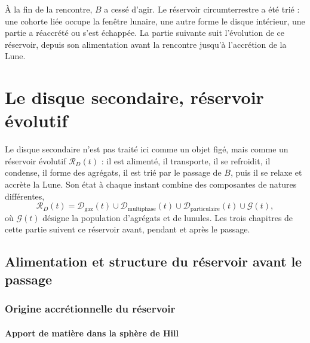 \documentclass[11pt,a4paper,openany]{report}
\newcommand{\RD}{\mathcal{R}_{D}}
\begin{document}

\begin{rappel}
À la fin de la rencontre, $B$ a cessé d'agir. Le réservoir circumterrestre a été trié : une cohorte liée
occupe la fenêtre lunaire, une autre forme le disque intérieur, une partie a réaccrété ou s'est
échappée. La partie suivante suit l'évolution de ce réservoir, depuis son alimentation avant la
rencontre jusqu'à l'accrétion de la Lune.
\end{rappel}
\part{Le disque secondaire, réservoir évolutif}
\label{part:reservoir}

\noindent
Le disque secondaire n'est pas traité ici comme un objet figé, mais comme un réservoir
évolutif $\RD(t)$ : il est alimenté, il transporte, il se refroidit, il condense, il forme des agrégats,
il est trié par le passage de $B$, puis il se relaxe et accrète la Lune. Son état à chaque instant
combine des composantes de natures différentes,
\begin{equation}
\RD(t)=\mathcal{D}_{\mathrm{gaz}}(t)\cup\mathcal{D}_{\mathrm{multiphase}}(t)\cup
\mathcal{D}_{\mathrm{particulaire}}(t)\cup\mathcal{G}(t),
\label{eq:RD}
\end{equation}
où $\mathcal{G}(t)$ désigne la population d'agrégats et de lunules. Les trois chapitres de cette
partie suivent ce réservoir avant, pendant et après le passage.

\chapter{Alimentation et structure du réservoir avant le passage}
\label{ch:structure}

\section{Origine accrétionnelle du réservoir}
\subsection{Apport de matière dans la sphère de Hill}
\end{document}
